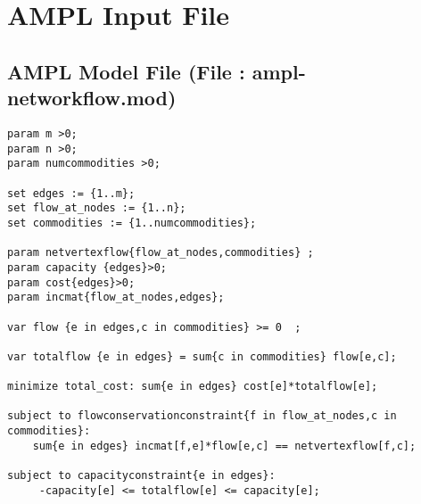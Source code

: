 \documentclass[10pt,a4paper,margin = 1.25cm]{article}
\begin{document}
\section*{AMPL Input File}
\subsection*{AMPL Model File (File : ampl-networkflow.mod) }
\begin{lstlisting}
param m >0;
param n >0;
param numcommodities >0;
 
set edges := {1..m};
set flow_at_nodes := {1..n};
set commodities := {1..numcommodities};

param netvertexflow{flow_at_nodes,commodities} ;
param capacity {edges}>0;
param cost{edges}>0;
param incmat{flow_at_nodes,edges};

var flow {e in edges,c in commodities} >= 0  ;

var totalflow {e in edges} = sum{c in commodities} flow[e,c];

minimize total_cost: sum{e in edges} cost[e]*totalflow[e];

subject to flowconservationconstraint{f in flow_at_nodes,c in commodities}:
	sum{e in edges} incmat[f,e]*flow[e,c] == netvertexflow[f,c];  

subject to capacityconstraint{e in edges}: 
     -capacity[e] <= totalflow[e] <= capacity[e];
\end{lstlisting}
\end{document}
